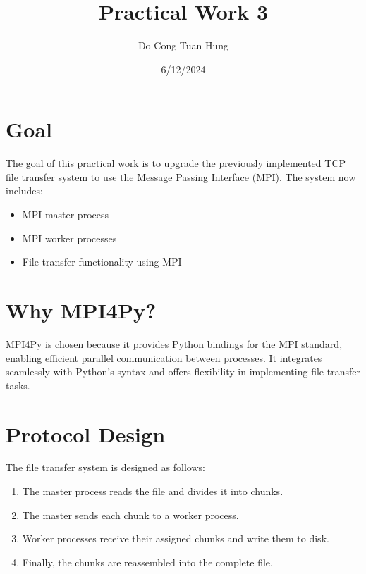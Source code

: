 \documentclass[a4paper,12pt]{article}
\title{Practical Work 3}
\author{Do Cong Tuan Hung}
\date{6/12/2024}
\begin{document}
\maketitle

\section*{Goal}
The goal of this practical work is to upgrade the previously implemented TCP file transfer system to use the Message Passing Interface (MPI). The system now includes:
\begin{itemize}
    \item MPI master process
    \item MPI worker processes
    \item File transfer functionality using MPI
\end{itemize}

\section*{Why MPI4Py?}
MPI4Py is chosen because it provides Python bindings for the MPI standard, enabling efficient parallel communication between processes. It integrates seamlessly with Python’s syntax and offers flexibility in implementing file transfer tasks.

\section*{Protocol Design}
The file transfer system is designed as follows:
\begin{enumerate}
    \item The master process reads the file and divides it into chunks.
    \item The master sends each chunk to a worker process.
    \item Worker processes receive their assigned chunks and write them to disk.
    \item Finally, the chunks are reassembled into the complete file.
\end{enumerate}
\end{document}
